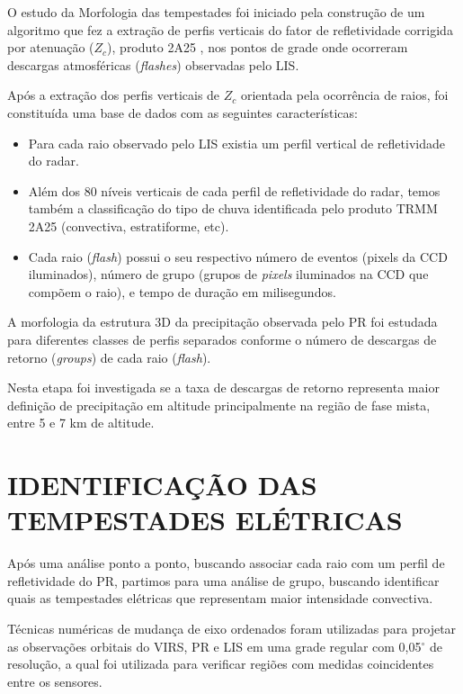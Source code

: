 O estudo da Morfologia das tempestades foi iniciado pela construção de um algoritmo que fez a extração de perfis verticais do fator de refletividade corrigida por atenuação ($Z_c$),  produto 2A25 \cite{iguchi2009}, nos pontos de grade onde ocorreram descargas atmosféricas (\textit{flashes}) observadas pelo LIS.

Após a extração dos perfis verticais de $Z_c$ orientada pela ocorrência de raios, foi constituída uma base de dados com as seguintes características:

\begin{itemize}
\item Para cada raio observado pelo LIS existia um perfil vertical de refletividade do radar.
\item Além dos 80 níveis verticais de cada perfil de refletividade do radar, temos também a classificação do tipo de chuva identificada pelo produto TRMM 2A25 (convectiva, estratiforme, etc).
\item Cada raio (\textit{flash}) possui o seu respectivo número de eventos (pixels da CCD iluminados), número de grupo (grupos de \textit{pixels} iluminados na CCD que compõem o raio), e tempo de duração em milisegundos. 
\end{itemize}

A morfologia da estrutura 3D da precipitação observada pelo PR foi estudada para diferentes classes de perfis separados conforme o número de descargas de retorno (\textit{groups}) de cada raio (\textit{flash}). 

Nesta etapa foi investigada se a taxa de descargas de retorno representa maior definição de precipitação em altitude principalmente na região de fase mista, entre 5 e 7 km de altitude. 

\section{IDENTIFICAÇÃO DAS TEMPESTADES ELÉTRICAS}

Após uma análise ponto a ponto, buscando associar cada raio com um perfil de refletividade do PR, partimos para uma análise de grupo, buscando identificar quais as tempestades elétricas que representam maior intensidade convectiva.

Técnicas numéricas de mudança de eixo ordenados foram utilizadas para projetar as
observações orbitais do VIRS, PR e LIS em uma grade regular com 0,05$^{\circ}$ de resolução, a qual foi utilizada para verificar regiões com medidas coincidentes entre os sensores.

